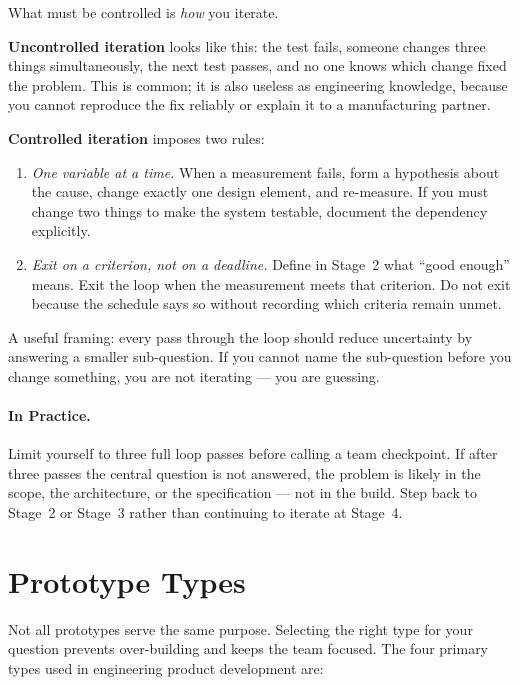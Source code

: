 What must be controlled is \emph{how} you iterate.

\textbf{Uncontrolled iteration} looks like
this: the test fails, someone changes three things simultaneously, the next
test passes, and no one knows which change fixed the problem.
This is common; it is also useless as engineering knowledge, because you
cannot reproduce the fix reliably or explain it to a manufacturing partner.

\textbf{Controlled iteration} imposes two rules:
\begin{enumerate}
  \item \emph{One variable at a time.} When a measurement fails, form a
        hypothesis about the cause, change exactly one design element, and
        re-measure. If you must change two things to make the system testable,
        document the dependency explicitly.
  \item \emph{Exit on a criterion, not on a deadline.} Define in Stage~2
        what ``good enough'' means. Exit the loop when the measurement meets
        that criterion. Do not exit because the schedule says so without
        recording which criteria remain unmet.
\end{enumerate}

A useful framing: every pass through the loop should reduce uncertainty by
answering a smaller sub-question. If you cannot name the sub-question before
you change something, you are not iterating --- you are guessing.

\paragraph{In Practice.}
Limit yourself to three full loop passes before calling a team checkpoint.
If after three passes the central question is not answered, the problem is
likely in the scope, the architecture, or the specification --- not in the
build.
Step back to Stage~2 or Stage~3 rather than continuing to iterate at
Stage~4.

\section{Prototype Types}
\label{sec:ch2-types}

Not all prototypes serve the same purpose.
Selecting the right type for your question prevents over-building and keeps
the team focused.
The four primary types used in engineering product development are:

